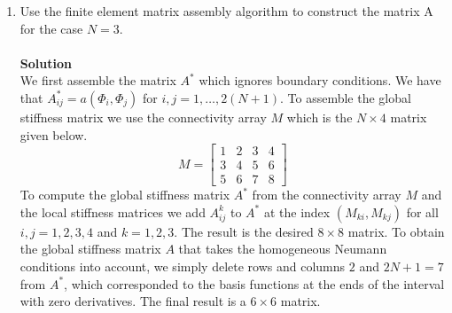 \documentclass[11pt]{article}
\begin{document}
\begin{enumerate}
\begin{enumerate}
{\bf Solution}\\
If we let cell $K$ be $[(k-1)/N,\ k/N]$ for $k=1,\ldots,N$, then we write the elements of the local stiffness matrix $A^k$ using
\begin{align*}
A^k_{ij} &  \\
=& \int_{(k-1)/N}^{k/N} \left\{N^2\phi_i'(Nx - (k-1))\phi_j'(Nx - (k-1)) + \phi_i(Nx - (k-1))\phi_j(Nx - (k-1)) \right\} \ dx
\end{align*}
for $i,j = 1,2,3,4$.  Using the change of variables $\xi = Nx - (k-1)$ we get
\[
A^k_{ij} = \int_0^1 \left\{N\phi_i'(\xi)\phi_j'(\xi) + N^{-1}\phi_i(\xi)\phi_j(\xi) \right\} \ d\xi
\]
Using Mathematica to compute the integrals we obtain
\[
A^k = N \begin{bmatrix}
6/5 & 1/10 & -6/5 & 1/10\\
1/10 & 2/15 & -1/10 & -1/30 \\
-6/5 & -1/10 & 6/5 & -1/10\\
1/10 & -1/30 & -1/10 & 2/15
\end{bmatrix}+ N^{-1}\begin{bmatrix}
13/35 & 11/210 & 9/70 & -13/420 \\
11/210 & 1/105 & 13/420 & -1/140 \\
9/70 & 13/420 & 13/35 & -11/210 \\
-13/420 & -1/140 & -11/210 & 1/105
\end{bmatrix}
\]
for every cell $K = 1,\ldots,N$.\\
\\

 \item Use the finite element matrix assembly algorithm to construct
   the matrix A for the case $N=3$.\\
\\

{\bf Solution}\\
We first assemble the matrix $A^*$ which ignores boundary conditions.  We have that $A^*_{ij} = a(\Phi_i, \Phi_j)$ for $i,j = 1,\ldots,2(N+1)$.  To assemble the global stiffness matrix we use the connectivity array $M$ which is the $N \times 4$ matrix given below.
\[
M = \begin{bmatrix}
1 & 2 & 3 & 4\\
3 & 4 & 5 & 6\\
5 & 6 & 7 & 8
\end{bmatrix}
\]
To compute the global stiffness matrix $A^*$ from the connectivity array $M$ and the local stiffness matrices we add $A^k_{ij}$ to $A^*$ at the index $(M_{ki}, M_{kj})$ for all $i,j = 1,2,3,4$ and $k = 1,2,3$.    The result is the desired $8\times 8$ matrix.  To obtain the global stiffness matrix $A$ that takes the homogeneous Neumann conditions into account, we simply delete rows and columns $2$ and $2N + 1 = 7$ from $A^*$, which corresponded to the basis functions at the ends of the interval with zero derivatives.  The final result is a $6\times 6$ matrix.\\
\\


\end{enumerate}
\end{enumerate}
\end{document}

